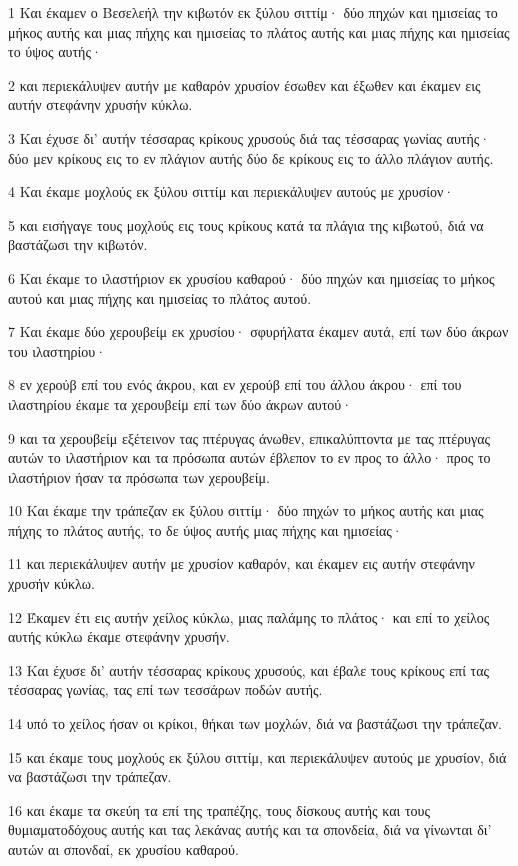 \par 1 Και έκαμεν ο Βεσελεήλ την κιβωτόν εκ ξύλου σιττίμ· δύο πηχών και ημισείας το μήκος αυτής και μιας πήχης και ημισείας το πλάτος αυτής και μιας πήχης και ημισείας το ύψος αυτής·
\par 2 και περιεκάλυψεν αυτήν με καθαρόν χρυσίον έσωθεν και έξωθεν και έκαμεν εις αυτήν στεφάνην χρυσήν κύκλω.
\par 3 Και έχυσε δι' αυτήν τέσσαρας κρίκους χρυσούς διά τας τέσσαρας γωνίας αυτής· δύο μεν κρίκους εις το εν πλάγιον αυτής δύο δε κρίκους εις το άλλο πλάγιον αυτής.
\par 4 Και έκαμε μοχλούς εκ ξύλου σιττίμ και περιεκάλυψεν αυτούς με χρυσίον·
\par 5 και εισήγαγε τους μοχλούς εις τους κρίκους κατά τα πλάγια της κιβωτού, διά να βαστάζωσι την κιβωτόν.
\par 6 Και έκαμε το ιλαστήριον εκ χρυσίου καθαρού· δύο πηχών και ημισείας το μήκος αυτού και μιας πήχης και ημισείας το πλάτος αυτού.
\par 7 Και έκαμε δύο χερουβείμ εκ χρυσίου· σφυρήλατα έκαμεν αυτά, επί των δύο άκρων του ιλαστηρίου·
\par 8 εν χερούβ επί του ενός άκρου, και εν χερούβ επί του άλλου άκρου· επί του ιλαστηρίου έκαμε τα χερουβείμ επί των δύο άκρων αυτού·
\par 9 και τα χερουβείμ εξέτεινον τας πτέρυγας άνωθεν, επικαλύπτοντα με τας πτέρυγας αυτών το ιλαστήριον και τα πρόσωπα αυτών έβλεπον το εν προς το άλλο· προς το ιλαστήριον ήσαν τα πρόσωπα των χερουβείμ.
\par 10 Και έκαμε την τράπεζαν εκ ξύλου σιττίμ· δύο πηχών το μήκος αυτής και μιας πήχης το πλάτος αυτής, το δε ύψος αυτής μιας πήχης και ημισείας·
\par 11 και περιεκάλυψεν αυτήν με χρυσίον καθαρόν, και έκαμεν εις αυτήν στεφάνην χρυσήν κύκλω.
\par 12 Έκαμεν έτι εις αυτήν χείλος κύκλω, μιας παλάμης το πλάτος· και επί το χείλος αυτής κύκλω έκαμε στεφάνην χρυσήν.
\par 13 Και έχυσε δι' αυτήν τέσσαρας κρίκους χρυσούς, και έβαλε τους κρίκους επί τας τέσσαρας γωνίας, τας επί των τεσσάρων ποδών αυτής.
\par 14 υπό το χείλος ήσαν οι κρίκοι, θήκαι των μοχλών, διά να βαστάζωσι την τράπεζαν.
\par 15 και έκαμε τους μοχλούς εκ ξύλου σιττίμ, και περιεκάλυψεν αυτούς με χρυσίον, διά να βαστάζωσι την τράπεζαν.
\par 16 και έκαμε τα σκεύη τα επί της τραπέζης, τους δίσκους αυτής και τους θυμιαματοδόχους αυτής και τας λεκάνας αυτής και τα σπονδεία, διά να γίνωνται δι' αυτών αι σπονδαί, εκ χρυσίου καθαρού.
